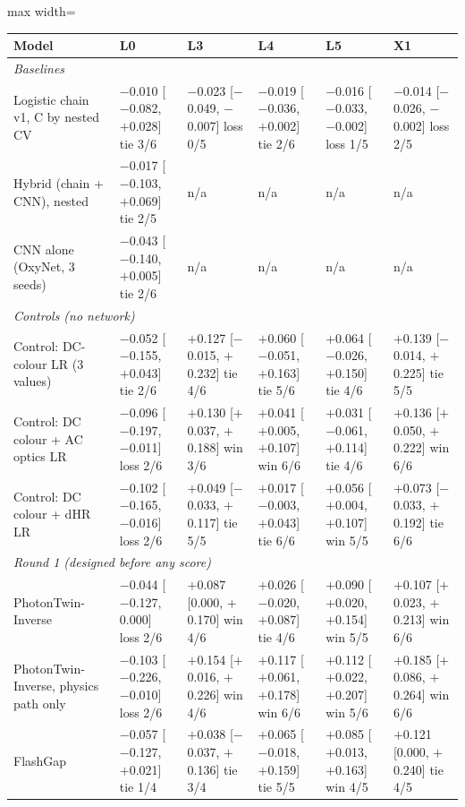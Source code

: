 {\tiny
\setlength{\tabcolsep}{2pt}
\begin{adjustbox}{max width=\linewidth}
\begin{tabular}{p{3.0cm}lllll}
\toprule
Model & L0 & L3 & L4 & L5 & X1 \\
\midrule
\multicolumn{6}{l}{\emph{Baselines}} \\
Logistic chain v1, C by nested CV & $-$0.010 [$-$0.082, $+$0.028] tie 3/6 & $-$0.023 [$-$0.049, $-$0.007] loss 0/5 & $-$0.019 [$-$0.036, $+$0.002] tie 2/6 & $-$0.016 [$-$0.033, $-$0.002] loss 1/5 & $-$0.014 [$-$0.026, $-$0.002] loss 2/5 \\
Hybrid (chain + CNN), nested & $-$0.017 [$-$0.103, $+$0.069] tie 2/5 & n/a & n/a & n/a & n/a \\
CNN alone (OxyNet, 3 seeds) & $-$0.043 [$-$0.140, $+$0.005] tie 2/6 & n/a & n/a & n/a & n/a \\
\multicolumn{6}{l}{\emph{Controls (no network)}} \\
Control: DC-colour LR (3 values) & $-$0.052 [$-$0.155, $+$0.043] tie 2/6 & $+$0.127 [$-$0.015, $+$0.232] tie 4/6 & $+$0.060 [$-$0.051, $+$0.163] tie 5/6 & $+$0.064 [$-$0.026, $+$0.150] tie 4/6 & $+$0.139 [$-$0.014, $+$0.225] tie 5/5 \\
Control: DC colour + AC optics LR & $-$0.096 [$-$0.197, $-$0.011] loss 2/6 & $+$0.130 [$+$0.037, $+$0.188] win 3/6 & $+$0.041 [$+$0.005, $+$0.107] win 6/6 & $+$0.031 [$-$0.061, $+$0.114] tie 4/6 & $+$0.136 [$+$0.050, $+$0.222] win 6/6 \\
Control: DC colour + dHR LR & $-$0.102 [$-$0.165, $-$0.016] loss 2/6 & $+$0.049 [$-$0.033, $+$0.117] tie 5/5 & $+$0.017 [$-$0.003, $+$0.043] tie 6/6 & $+$0.056 [$+$0.004, $+$0.107] win 5/5 & $+$0.073 [$-$0.033, $+$0.192] tie 6/6 \\
\multicolumn{6}{l}{\emph{Round 1 (designed before any score)}} \\
PhotonTwin-Inverse & $-$0.044 [$-$0.127, 0.000] loss 2/6 & $+$0.087 [0.000, $+$0.170] win 4/6 & $+$0.026 [$-$0.020, $+$0.087] tie 4/6 & $+$0.090 [$+$0.020, $+$0.154] win 5/5 & $+$0.107 [$+$0.023, $+$0.213] win 6/6 \\
PhotonTwin-Inverse, physics path only & $-$0.103 [$-$0.226, $-$0.010] loss 2/6 & $+$0.154 [$+$0.016, $+$0.226] win 4/6 & $+$0.117 [$+$0.061, $+$0.178] win 6/6 & $+$0.112 [$+$0.022, $+$0.207] win 5/6 & $+$0.185 [$+$0.086, $+$0.264] win 6/6 \\
FlashGap & $-$0.057 [$-$0.127, $+$0.021] tie 1/4 & $+$0.038 [$-$0.037, $+$0.136] tie 3/4 & $+$0.065 [$-$0.018, $+$0.159] tie 5/5 & $+$0.085 [$+$0.013, $+$0.163] win 4/5 & $+$0.121 [0.000, $+$0.240] tie 4/5 \\

\end{tabular}
\end{adjustbox}}
